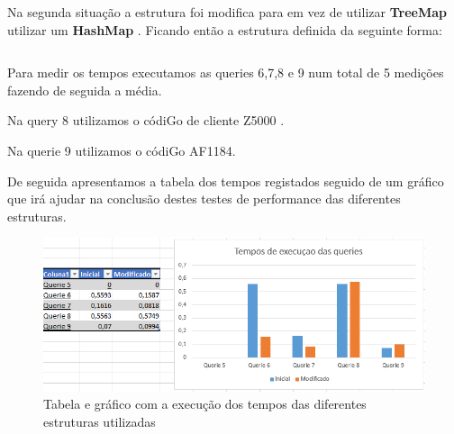 \begin{verbatim}

\end{verbatim}

\par Na segunda situação a estrutura foi modifica para em vez de utilizar \color{blue} \textbf{TreeMap} \color{black} utilizar um
\color{blue} \textbf{HashMap} \color{black}. Ficando então a estrutura definida da seguinte forma:



\begin{verbatim}

\end{verbatim}

\par Para medir os tempos executamos as queries 6,7,8 e 9 num total de 5 medições fazendo de seguida a média.

Na query 8 utilizamos o códiGo de cliente Z5000 . 

Na querie 9 utilizamos o códiGo AF1184. 

\par De seguida apresentamos a tabela dos tempos registados seguido de um gráfico que irá ajudar na conclusão destes testes de performance das diferentes estruturas.

\begin{figure}[h!]
	\includegraphics[scale=0.8]{graficoqueries}  
	\caption{Tabela e gráfico com a execução dos tempos das diferentes estruturas utilizadas }  
\end{figure}
  	
